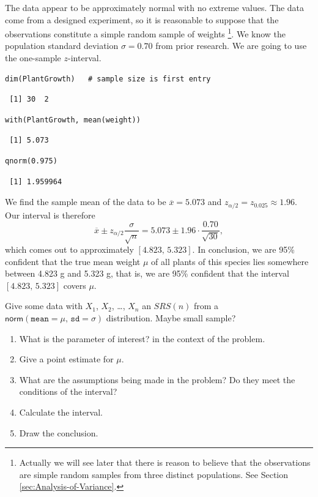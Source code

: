 \documentclass[captions=tableheading]{scrbook}
\begin{document}
The data appear to be approximately normal with no extreme values. The data come from a designed experiment, so it is reasonable to suppose that the observations constitute a simple random sample of weights
\footnote{Actually we will see later that there is reason to believe that the observations are simple random samples from three distinct populations. See Section \ref{sec:Analysis-of-Variance}.}. 
We know the population standard deviation \(\sigma=0.70\) from prior research. We are going to use the one-sample \(z\)-interval.


\begin{verbatim}
dim(PlantGrowth)   # sample size is first entry
\end{verbatim}

\begin{verbatim}
 [1] 30  2
\end{verbatim}


\begin{verbatim}
with(PlantGrowth, mean(weight))
\end{verbatim}

\begin{verbatim}
 [1] 5.073
\end{verbatim}


\begin{verbatim}
qnorm(0.975)
\end{verbatim}

\begin{verbatim}
 [1] 1.959964
\end{verbatim}

We find the sample mean of the data to be \(\overline{x}=5.073\) and \(z_{\alpha/2}=z_{0.025}\approx1.96\). Our interval is therefore
\[
\overline{x}\pm z_{\alpha/2}\frac{\sigma}{\sqrt{n}}=5.073\pm1.96\cdot\frac{0.70}{\sqrt{30}},
\]
which comes out to approximately \([4.823,\,5.323]\). In conclusion, we are 95\% confident that the true mean weight \(\mu\) of all plants of this species lies somewhere between 4.823 g and 5.323 g, that is, we are 95\% confident that the interval \([4.823,\,5.323]\) covers \(\mu\).

\begin{example}
Give some data with \(X_{1}\), \(X_{2}\), \ldots{}, \(X_{n}\) an \(SRS(n)\) from a \(\mathsf{norm}(\mathtt{mean}=\mu,\,\mathtt{sd}=\sigma)\) distribution. Maybe small sample?
\end{example}

\begin{enumerate}
\item What is the parameter of interest? in the context of the problem.
\item Give a point estimate for \(\mu\).
\item What are the assumptions being made in the problem? Do they meet the conditions of the interval?
\item Calculate the interval.
\item Draw the conclusion.
\end{enumerate}
\end{document}
